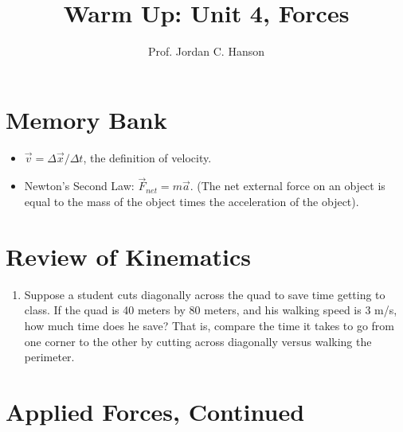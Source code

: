 \documentclass{article}
\begin{document}
\title{Warm Up: Unit 4, Forces}
\author{Prof. Jordan C. Hanson}

\maketitle

\section{Memory Bank}

\begin{itemize}
\item $\vec{v} = \Delta \vec{x} / \Delta t$, the definition of velocity.
\item Newton's Second Law: $\vec{F}_{net} = m\vec{a}$. (The net external force on an object is equal to the mass of the object times the acceleration of the object).
\end{itemize}

\section{Review of Kinematics}

\begin{enumerate}
\item Suppose a student cuts diagonally across the quad to save time getting to class.  If the quad is 40 meters by 80 meters, and his walking speed is 3 m/s, how much time does he save?  That is, compare the time it takes to go from one corner to the other by cutting across diagonally versus walking the perimeter. \\ \vspace{1.5cm}
\end{enumerate}

\section{Applied Forces, Continued}
\end{document}
